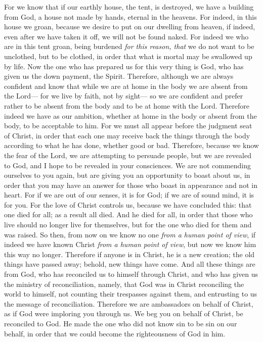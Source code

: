 \begin{biblechapter} %
 For we know that if our earthly house, the tent, is destroyed, we have a building from God, a house not made by hands, eternal in the heavens.
\verse For indeed, in this house we groan, because we desire to put on our dwelling from heaven,
\verse if indeed, even after we have taken it off, we will not be found naked.
\verse For indeed we who are in this tent groan, being burdened \textit{for this reason, that} we do not want to be unclothed, but to be clothed, in order that what is mortal may be swallowed up by life.
\verse Now the one who has prepared us for this very thing is God, who has given us the down payment, the Spirit.
\verse Therefore, although we are always confident and know that while we are at home in the body we are absent from the Lord—
\verse for we live by faith, not by sight—
\verse so we are confident and prefer rather to be absent from the body and to be at home with the Lord.
\verse Therefore indeed we have as our ambition, whether at home in the body or absent from the body, to be acceptable to him.
\verse For we must all appear before the judgment seat of Christ, in order that each one may receive back the things through the body according to what he has done, whether good or bad.
 Therefore, because we know the fear of the Lord, we are attempting to persuade people, but we are revealed to God, and I hope to be revealed in your consciences.
\verse We are not commending ourselves to you again, but are giving you an opportunity to boast about us, in order that you may have an answer for those who boast in appearance and not in heart.
\verse For if we are out of our senses, it is for God; if we are of sound mind, it is for you.
\verse For the love of Christ controls us, because we have concluded this: that one died for all; as a result all died.
\verse And he died for all, in order that those who live should no longer live for themselves, but for the one who died for them and was raised.
\verse So then, from now on we know no one \textit{from a human point of view}, if indeed we have known Christ \textit{from a human point of view}, but now we know him this way no longer.
\verse Therefore if anyone is in Christ, he is a new creation; the old things have passed away; behold, new things have come.
\verse And all these things are from God, who has reconciled us to himself through Christ, and who has given us the ministry of reconciliation,
\verse namely, that God was in Christ reconciling the world to himself, not counting their trespasses against them, and entrusting to us the message of reconciliation.
\verse Therefore we are ambassadors on behalf of Christ, as if God were imploring you through us. We beg you on behalf of Christ, be reconciled to God.
\verse He made the one who did not know sin to be sin on our behalf, in order that we could become the righteousness of God in him.
\end{biblechapter}

